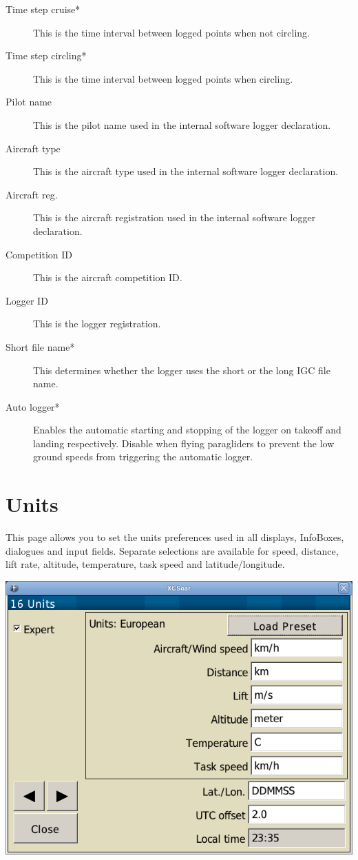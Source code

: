 \begin{description}
\item[Time step cruise*]  This is the time interval between logged points when 
  not circling. 
\item[Time step circling*]  This is the time interval between logged points when 
  circling. 
\item[Pilot name]  This is the pilot name used in the internal software logger 
  declaration.
\item[Aircraft type]  This is the aircraft type used in the internal software 
  logger declaration.
\item[Aircraft reg.]  This is the aircraft registration used in the internal 
  software logger declaration.
\item[Competition ID]  This is the aircraft competition ID.
\item[Logger ID]  This is the logger registration.
\item[Short file name*]  This determines whether the logger uses the short or the 
  long IGC file name.
\item[Auto logger*]  Enables the automatic starting and stopping of the logger
  on takeoff and landing respectively. Disable when flying paragliders to prevent 
  the low ground speeds from triggering the automatic logger.
\end{description}


\clearpage
\section{Units}

This page allows you to set the units preferences used in all
displays, InfoBoxes, dialogues and input fields.  Separate selections
are available for speed, distance, lift rate, altitude, temperature, task
speed and latitude/longitude.

\begin{center}
\includegraphics[angle=0,width=0.8\linewidth,keepaspectratio='true']{figures/config-units.png}
\end{center}

